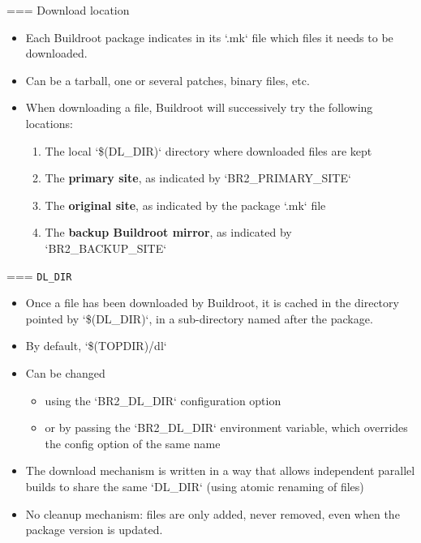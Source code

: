 === {Download location}
  \begin{itemize}
  \item Each Buildroot package indicates in its `.mk` file which
    files it needs to be downloaded.
  \item Can be a tarball, one or several patches, binary files, etc.
  \item When downloading a file, Buildroot will successively try the
    following locations:
    \begin{enumerate}
    \item The local `\$(DL_DIR)` directory where downloaded files
      are kept
    \item The {\bf primary site}, as indicated by `BR2_PRIMARY_SITE`
    \item The {\bf original site}, as indicated by the package
      `.mk` file
    \item The {\bf backup Buildroot mirror}, as indicated by
      `BR2_BACKUP_SITE`
    \end{enumerate}
  \end{itemize}


=== {{\tt DL\_DIR}}
  \begin{itemize}
  \item Once a file has been downloaded by Buildroot, it is cached in
    the directory pointed by
    `\$(DL_DIR)`, in a sub-directory named after the package.
  \item By default, `\$(TOPDIR)/dl`
  \item Can be changed
    \begin{itemize}
    \item using the `BR2_DL_DIR` configuration option
    \item or by passing the `BR2_DL_DIR` environment variable,
      which overrides the config option of the same name
    \end{itemize}
  \item The download mechanism is written in a way that allows
    independent parallel builds to share the same `DL_DIR` (using
    atomic renaming of files)
  \item No cleanup mechanism: files are only added, never removed,
    even when the package version is updated.
  \end{itemize}


